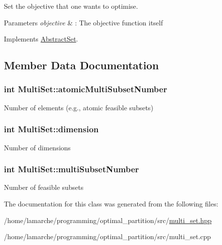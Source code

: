 Set the objective that one wants to optimise. 


\begin{DoxyParams}{Parameters}
{\em objective} & \-: The objective function itself \\
\hline
\end{DoxyParams}


Implements \hyperlink{classAbstractSet_a7aef71679a18ab7965d1098da15b26c2}{Abstract\-Set}.



\subsection{Member Data Documentation}
\hypertarget{classMultiSet_a3084e5afaa18d1f19a38f7139f827cfc}{
\subsubsection[{atomic\-Multi\-Subset\-Number}]{\setlength{\rightskip}{0pt plus 5cm}int Multi\-Set\-::atomic\-Multi\-Subset\-Number}}\label{classMultiSet_a3084e5afaa18d1f19a38f7139f827cfc}
Number of elements (e.\-g., atomic feasible subsets) \hypertarget{classMultiSet_a1a49a7a8c3d0db003198312c3bd541af}{
\subsubsection[{dimension}]{\setlength{\rightskip}{0pt plus 5cm}int Multi\-Set\-::dimension}}\label{classMultiSet_a1a49a7a8c3d0db003198312c3bd541af}
Number of dimensions \hypertarget{classMultiSet_a9c0c781a33f40bb2cd28110805572b7a}{
\subsubsection[{multi\-Subset\-Number}]{\setlength{\rightskip}{0pt plus 5cm}int Multi\-Set\-::multi\-Subset\-Number}}\label{classMultiSet_a9c0c781a33f40bb2cd28110805572b7a}
Number of feasible subsets 

The documentation for this class was generated from the following files\-:\begin{DoxyCompactItemize}
\item 
/home/lamarche/programming/optimal\-\_\-partition/src/\hyperlink{multi__set_8hpp}{multi\-\_\-set.\-hpp}\item 
/home/lamarche/programming/optimal\-\_\-partition/src/multi\-\_\-set.\-cpp\end{DoxyCompactItemize}
